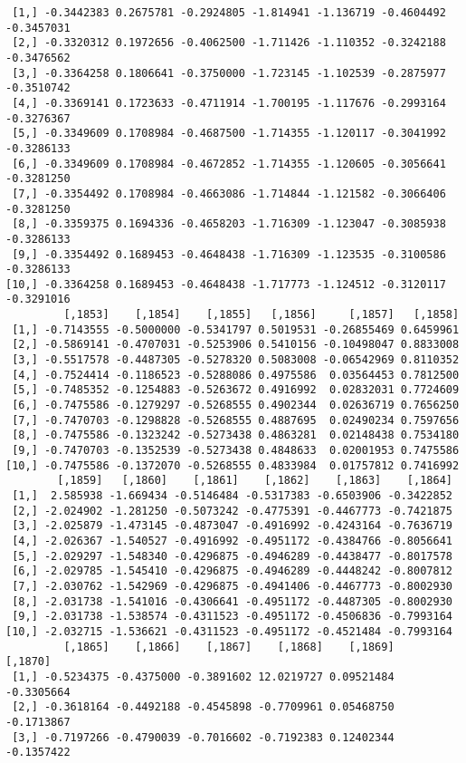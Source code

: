 \documentclass[
  letterpaper,
  DIV=11,
  numbers=noendperiod]{scrreprt}
\begin{document}
\begin{verbatim}
 [1,] -0.3442383 0.2675781 -0.2924805 -1.814941 -1.136719 -0.4604492 -0.3457031
 [2,] -0.3320312 0.1972656 -0.4062500 -1.711426 -1.110352 -0.3242188 -0.3476562
 [3,] -0.3364258 0.1806641 -0.3750000 -1.723145 -1.102539 -0.2875977 -0.3510742
 [4,] -0.3369141 0.1723633 -0.4711914 -1.700195 -1.117676 -0.2993164 -0.3276367
 [5,] -0.3349609 0.1708984 -0.4687500 -1.714355 -1.120117 -0.3041992 -0.3286133
 [6,] -0.3349609 0.1708984 -0.4672852 -1.714355 -1.120605 -0.3056641 -0.3281250
 [7,] -0.3354492 0.1708984 -0.4663086 -1.714844 -1.121582 -0.3066406 -0.3281250
 [8,] -0.3359375 0.1694336 -0.4658203 -1.716309 -1.123047 -0.3085938 -0.3286133
 [9,] -0.3354492 0.1689453 -0.4648438 -1.716309 -1.123535 -0.3100586 -0.3286133
[10,] -0.3364258 0.1689453 -0.4648438 -1.717773 -1.124512 -0.3120117 -0.3291016
         [,1853]    [,1854]    [,1855]   [,1856]     [,1857]   [,1858]
 [1,] -0.7143555 -0.5000000 -0.5341797 0.5019531 -0.26855469 0.6459961
 [2,] -0.5869141 -0.4707031 -0.5253906 0.5410156 -0.10498047 0.8833008
 [3,] -0.5517578 -0.4487305 -0.5278320 0.5083008 -0.06542969 0.8110352
 [4,] -0.7524414 -0.1186523 -0.5288086 0.4975586  0.03564453 0.7812500
 [5,] -0.7485352 -0.1254883 -0.5263672 0.4916992  0.02832031 0.7724609
 [6,] -0.7475586 -0.1279297 -0.5268555 0.4902344  0.02636719 0.7656250
 [7,] -0.7470703 -0.1298828 -0.5268555 0.4887695  0.02490234 0.7597656
 [8,] -0.7475586 -0.1323242 -0.5273438 0.4863281  0.02148438 0.7534180
 [9,] -0.7470703 -0.1352539 -0.5273438 0.4848633  0.02001953 0.7475586
[10,] -0.7475586 -0.1372070 -0.5268555 0.4833984  0.01757812 0.7416992
        [,1859]   [,1860]    [,1861]    [,1862]    [,1863]    [,1864]
 [1,]  2.585938 -1.669434 -0.5146484 -0.5317383 -0.6503906 -0.3422852
 [2,] -2.024902 -1.281250 -0.5073242 -0.4775391 -0.4467773 -0.7421875
 [3,] -2.025879 -1.473145 -0.4873047 -0.4916992 -0.4243164 -0.7636719
 [4,] -2.026367 -1.540527 -0.4916992 -0.4951172 -0.4384766 -0.8056641
 [5,] -2.029297 -1.548340 -0.4296875 -0.4946289 -0.4438477 -0.8017578
 [6,] -2.029785 -1.545410 -0.4296875 -0.4946289 -0.4448242 -0.8007812
 [7,] -2.030762 -1.542969 -0.4296875 -0.4941406 -0.4467773 -0.8002930
 [8,] -2.031738 -1.541016 -0.4306641 -0.4951172 -0.4487305 -0.8002930
 [9,] -2.031738 -1.538574 -0.4311523 -0.4951172 -0.4506836 -0.7993164
[10,] -2.032715 -1.536621 -0.4311523 -0.4951172 -0.4521484 -0.7993164
         [,1865]    [,1866]    [,1867]    [,1868]    [,1869]    [,1870]
 [1,] -0.5234375 -0.4375000 -0.3891602 12.0219727 0.09521484 -0.3305664
 [2,] -0.3618164 -0.4492188 -0.4545898 -0.7709961 0.05468750 -0.1713867
 [3,] -0.7197266 -0.4790039 -0.7016602 -0.7192383 0.12402344 -0.1357422

\end{verbatim}
\end{document}
